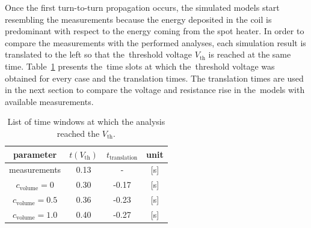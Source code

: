 Once the first turn-to-turn propagation occurs, the simulated models start resembling the measurements because the energy deposited in the coil is predominant with respect to the energy coming from the spot heater. In order to compare the measurements with the performed analyses, each simulation result is translated to the left so that the~threshold voltage $V_\text{th}$ is reached at the same time. Table~\ref{table: skew_quad_v_res_q_det} presents the~time slots at which the~threshold voltage was obtained for every case and the translation times. The translation times are used in the next section to compare the voltage and resistance rise in the~models with available measurements. 

\begin{table}[H]
    \caption{List of time windows at which the analysis reached the $V_\text{th}$.} 
    \vspace{-1.em} 
    \fontsize{10}{10}
    \selectfont 
    \renewcommand{\arraystretch}{1.5}
    \begin{center}
        \begin{tabular}{ cccc }  
        \hline
        parameter & $t(V_\text{th})$ & $t_\text{translation}$ & unit \\
        \hline
        measurements & 0.13 & - & [s] \\
        $c_\text{volume}=0$ & 0.30 & -0.17 & [s] \\
        $c_\text{volume}=0.5$ & 0.36 & -0.23 & [s] \\
        $c_\text{volume}=1.0$ & 0.40 & -0.27 & [s] \\
        \hline 
        \end{tabular}
    \end{center}  
     \label{table: skew_quad_v_res_q_det} 
 \end{table}
